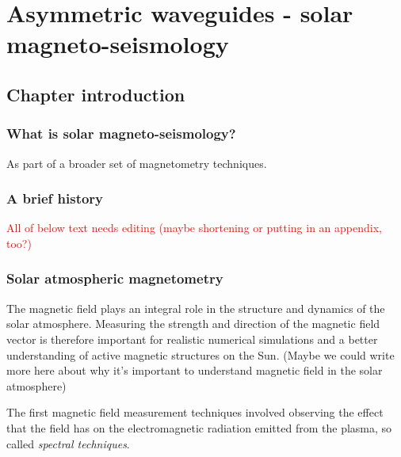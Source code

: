 \documentclass[12pt]{../style-files/ociamthesis}
\begin{document}
\baselineskip=18pt

\setcounter{secnumdepth}{3}
\setcounter{tocdepth}{3}

\setcounter{chapter}{3}


\chapter{Asymmetric waveguides - solar magneto-seismology}
\label{chap: SMS}

\section{Chapter introduction}
\label{sec: SMS intro}

\subsection{What is solar magneto-seismology?}
As part of a broader set of magnetometry techniques.

\subsection{A brief history}








\textcolor{red}{All of below text needs editing (maybe shortening or putting in an appendix, too?)}
\subsection{Solar atmospheric magnetometry}
The magnetic field plays an integral role in the structure and dynamics of the solar atmosphere. Measuring the strength and direction of the magnetic field vector is therefore important for realistic numerical simulations and a better understanding of active magnetic structures on the Sun. (Maybe we could write more here about why it's important to understand magnetic field in the solar atmosphere)

The first magnetic field measurement techniques involved observing the effect that the field has on the electromagnetic radiation emitted from the plasma, so called \textit{spectral techniques}.
\end{document}
